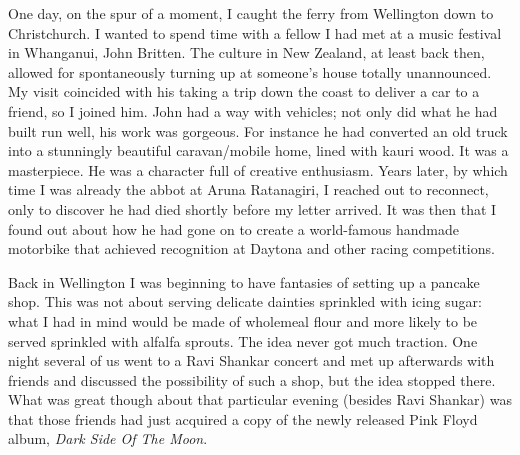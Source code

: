 One day, on the spur of a moment, I caught the ferry from Wellington
down to Christchurch. I wanted to spend time with a fellow I had met at
a music festival in Whanganui, John Britten\cite{britten}.
The culture in New Zealand, at least back
then, allowed for spontaneously turning up at someone's house totally
unannounced. My visit coincided with his taking a trip down the coast to
deliver a car to a friend, so I joined him. John had a way with
vehicles; not only did what he had built run well, his work was
gorgeous. For instance he had converted an old truck into a stunningly
beautiful caravan/mobile home, lined with kauri wood. It was a
masterpiece. He was a character full of creative enthusiasm. Years
later, by which time I was already the abbot at Aruna Ratanagiri, I
reached out to reconnect, only to discover he had died shortly before my
letter arrived. It was then that I found out about how he had gone on to
create a world-famous handmade motorbike that achieved recognition at
Daytona\cite{daytona} and other racing competitions.

Back in Wellington I was beginning to have fantasies of setting up a
pancake shop. This was not about serving delicate dainties sprinkled
with icing sugar: what I had in mind would be made of wholemeal flour
and more likely to be served sprinkled with alfalfa sprouts. The idea
never got much traction. One night several of us went to a Ravi Shankar
concert and met up afterwards with friends and discussed the possibility
of such a shop, but the idea stopped there. What was great though about
that particular evening (besides Ravi Shankar) was that those friends
had just acquired a copy of the newly released Pink Floyd album,
\emph{Dark Side Of The Moon}.

